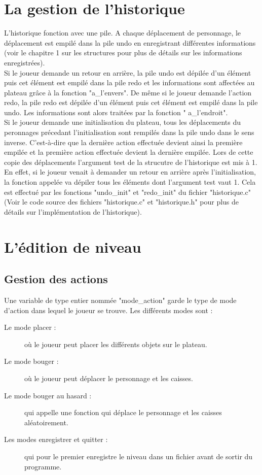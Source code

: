 \documentclass{report}
\begin{document}
	\chapter{La gestion de l'historique}
L'historique fonction avec une pile. A chaque déplacement de personnage, le déplacement est empilé dans la pile undo en enregistrant différentes informations (voir le chapitre 1 sur les structures pour plus de détails sur les informations enregistrées).\\
Si le joueur demande un retour en arrière, la pile undo est dépilée d'un élément puis cet élément est empilé dans la pile redo et les informations sont affectées au plateau grâce à la fonction "a\_l'envers".
De même si le joueur demande l'action redo, la pile redo est dépilée d'un élément puis cet élément est empilé dans la pile undo. Les informations sont alors traitées par la fonction " a\_l'endroit".\\
Si le joueur demande une initialisation du plateau, tous les déplacements du peronnages précedant l'initialisation sont rempilés dans la pile undo dans le sens inverse. C'est-à-dire que la dernière action effectuée devient ainsi la première empilée et la première action effectuée devient la dernière empilée.
Lors de cette copie des déplacements l'argument test de la strucutre de l'historique est mis à 1.
En effet, si le joueur venait à demander un retour en arrière après l'initialisation, la fonction appelée va dépiler tous les éléments dont l'argument test vaut 1.
Cela est effectué par les fonctions "undo\_init" et "redo\_init" du fichier "historique.c" 
(Voir le code source des fichiers "historique.c" et "historique.h" pour plus de détails sur l'implémentation de l'historique).
	
	\chapter{L'édition de niveau}
		\section{Gestion des actions}
Une variable de type entier nommée "mode\_action" garde le type de mode d'action dans lequel le joueur se trouve. Les différents modes sont :
\begin{description}
\item[Le mode placer :]où le joueur peut placer les différents objets sur le plateau.
\item[Le mode bouger :]où le joueur peut déplacer le personnage et les caisses.
\item[Le mode bouger au hasard :]qui appelle une fonction qui déplace le personnage et les caisses aléatoirement.
\item[Les modes enregistrer et quitter :] qui pour le premier enregistre le niveau dans un fichier avant de sortir du programme.
\end{description}
\end{document}
